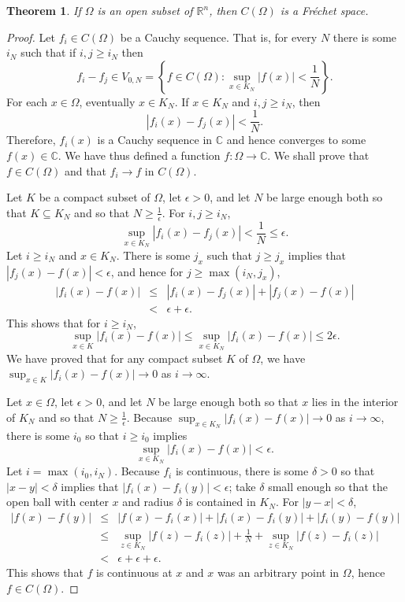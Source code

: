 \documentclass{article}
\newtheorem{theorem}{Theorem}
\begin{document}
\begin{theorem}
If $\Omega$ is an open subset of $\mathbb{R}^n$, then $C(\Omega)$ is a Fr\'echet space.
\label{continuous}
\end{theorem}
\begin{proof}
Let $f_i \in C(\Omega)$ be a Cauchy sequence. That is, for every $N$ there is some $i_N$ such that if $i,j \geq i_N$ then
\[
f_i-f_j \in V_{0,N} = \left\{f \in C(\Omega): \sup_{x \in K_N}|f(x)|<\frac{1}{N} \right\}.
\]
 For each $x \in \Omega$, eventually $x \in K_N$.
If $x \in K_N$ and $i,j \geq i_N$, then
\[
|f_i(x)-f_j(x)| <\frac{1}{N}.
\]
Therefore, $f_i(x)$ is a Cauchy sequence in $\mathbb{C}$ and hence converges to some $f(x) \in \mathbb{C}$. We have thus defined a function
$f:\Omega \to \mathbb{C}$. We shall prove that $f \in C(\Omega)$ and that $f_i \to f$ in $C(\Omega)$.


Let $K$ be a compact subset of $\Omega$, let
$\epsilon >0$, and let
$N$ be large enough both so that $K \subseteq K_N$ and so that $N \geq \frac{1}{\epsilon}$. 
For $i,j \geq i_{N}$,
\[
\sup_{x \in K_{N}} |f_i(x)-f_j(x)| < \frac{1}{N} \leq \epsilon.
\]
Let $i \geq i_{N}$ and  $x \in K_{N}$. There is some $j_x$ such that $j \geq j_x$ implies that $|f_j(x)-f(x)|<\epsilon$, and hence for $j \geq \max(i_{N},j_x)$,
\begin{eqnarray*}
|f_i(x)-f(x)|&\leq&|f_i(x)-f_j(x)|+|f_j(x)-f(x)|\\
&<&\epsilon+\epsilon.
\end{eqnarray*}
This shows that for $i \geq i_{N}$,
\[
\sup_{x \in K} |f_i(x)-f(x)| \leq \sup_{x \in K_{N}} |f_i(x)-f(x)| \leq 2\epsilon.
\]
We have proved that for any compact subset $K$ of $\Omega$,  we have $\sup_{x \in K} |f_i(x)-f(x)| \to 0$ as $i \to \infty$.

Let $x \in \Omega$, let $\epsilon>0$, and  let $N$ be large enough both  so that $x$ lies in the interior of $K_N$ and so that $N \geq \frac{1}{\epsilon}$.
Because $\sup_{x \in K_N} |f_i(x)-f(x)| \to 0$ as $i \to \infty$, there is some $i_0$ so that $i \geq i_0$ implies 
\[
\sup_{x \in K_N} |f_i(x)-f(x)| < \epsilon.
\]
Let $i = \max(i_0,i_N)$. Because $f_i$ is continuous, there is some $\delta>0$ so that $|x-y|<\delta$ implies that $|f_i(x)-f_i(y)|<\epsilon$;
take $\delta$ small enough so that the open ball with center $x$ and radius $\delta$ is contained in $K_N$.
For $|y-x|<\delta$,
\begin{eqnarray*}
|f(x)-f(y)|&\leq&|f(x)-f_i(x)|+|f_i(x)-f_i(y)|+|f_i(y)-f(y)|\\
&\leq&\sup_{z \in K_N} |f(z)-f_i(z)| + \frac{1}{N} + \sup_{z \in K_N} |f(z)-f_i(z)|\\
&<&\epsilon+\epsilon+\epsilon.
\end{eqnarray*}
This shows that $f$ is continuous at $x$ and $x$ was an arbitrary point in $\Omega$, hence $f \in C(\Omega)$.


\end{proof}
\end{document}
